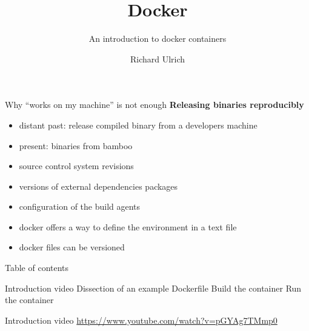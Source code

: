 \documentclass[11pt, aspectratio=169]{beamer}
\author{Richard Ulrich}
\title{Docker}
\subtitle{An introduction to docker containers}
\institute{BORM Informatik AG}
\begin{document}
\begin{frame}
\titlepage
\end{frame}

\begin{frame}{Why ``works on my machine'' is not enough}
\textbf{Releasing binaries reproducibly}
\begin{itemize}
\item distant past: release compiled binary from a developers machine
\item present: binaries from bamboo
\item source control system revisions
\item versions of external dependencies packages
\item configuration of the build agents
\item docker offers a way to define the environment in a text file
\item docker files can be versioned
\end{itemize}
\end{frame}

\begin{frame}{Table of contents}
\begin{outline}
\1 Introduction video
\1 Dissection of an example
  \2 Dockerfile
  \2 Build the container
  \2 Run the container
\end{outline}
\end{frame}

\begin{frame}{Introduction video}
\centering
{}
\url{https://www.youtube.com/watch?v=pGYAg7TMmp0}
\end{frame}
\end{document}
